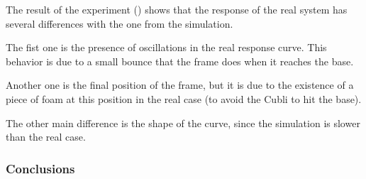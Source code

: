 The result of the experiment () shows that the response of the real system has several differences with the one from the simulation.

The fist one is the presence of oscillations in the real response curve. This behavior is due to a small bounce that the frame does when it reaches the base.

Another one is the final position of the frame, but it is due to the existence of a piece of foam at this position in the real case (to avoid the Cubli to hit the base).

The other main difference is the shape of the curve, since the simulation is slower than the real case.

\subsubsection{Conclusions}

